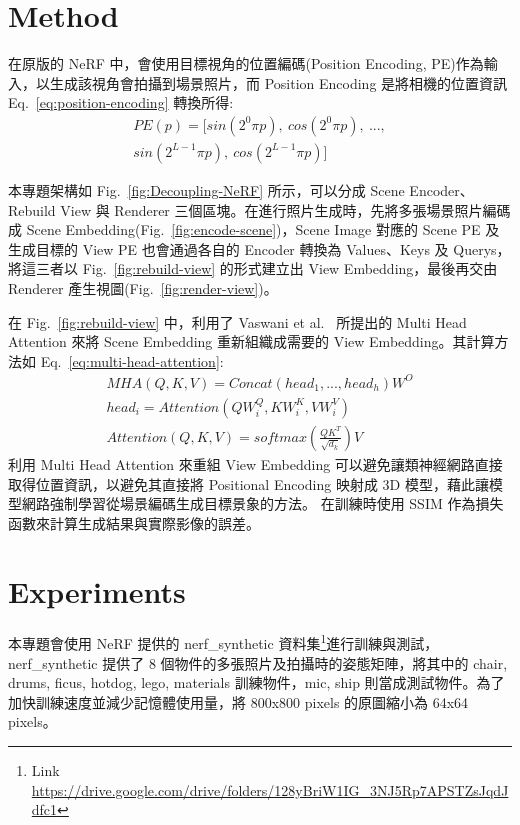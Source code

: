 \documentclass[10pt,twocolumn,letterpaper]{article}
\begin{document}
\begin{CJK}{UTF8}{bkai}
   \section{Method}

   在原版的 NeRF 中，會使用目標視角的位置編碼(Position Encoding,
   PE)作為輸入，以生成該視角會拍攝到場景照片，而 Position Encoding
   是將相機的位置資訊 Eq.~\ref{eq:position-encoding} 轉換所得:
   \begin{equation}
      \begin{aligned}
         PE(p)=[sin(2^{0}{\pi}{p}),~cos(2^{0}{\pi}{p}),~..., \\
         sin(2^{L-1}{\pi}{p}),~cos(2^{L-1}{\pi}{p})]
      \end{aligned}
      \label{eq:position-encoding}
   \end{equation}

   本專題架構如 Fig.~\ref{fig:Decoupling-NeRF} 所示，可以分成 Scene Encoder、Rebuild View 與 Renderer
   三個區塊。在進行照片生成時，先將多張場景照片編碼成 Scene Embedding(Fig.~\ref{fig:encode-scene})，Scene Image 對應的 Scene PE 及生成目標的 View
   PE 也會通過各自的 Encoder 轉換為 Values、Keys 及 Querys，將這三者以 Fig.~\ref{fig:rebuild-view} 的形式建立出
   View Embedding，最後再交由 Renderer 產生視圖(Fig.~\ref{fig:render-view})。

   在 Fig.~\ref{fig:rebuild-view} 中，利用了 Vaswani et al.~\cite{AttentionIsAllYouNeed} 所提出的
   Multi Head Attention 來將 Scene Embedding 重新組織成需要的 View Embedding。其計算方法如 Eq.~\ref{eq:multi-head-attention}:
   \begin{equation}
      \begin{aligned}
         MHA(Q, K, V) = Concat(head_{1},...,head_{h})W^{O}      \\
         head_{i} = Attention(QW^{Q}_{i},KW^{K}_{i},VW^{V}_{i}) \\
         Attention(Q, K, V ) = softmax(\frac{QK^{T}}{\sqrt{d_{k}}})V
      \end{aligned}
      \label{eq:multi-head-attention}
   \end{equation}
   利用 Multi Head Attention 來重組 View Embedding 可以避免讓類神經網路直接取得位置資訊，以避免其直接將
   Positional Encoding 映射成 3D 模型，藉此讓模型網路強制學習從場景編碼生成目標景象的方法。
   在訓練時使用 SSIM\cite{SSIM} 作為損失函數來計算生成結果與實際影像的誤差。

   \section{Experiments}
   本專題會使用 NeRF 提供的 nerf\_synthetic 資料集\footnote{Link \href{https://drive.google.com/drive/folders/128yBriW1IG_3NJ5Rp7APSTZsJqdJdfc1}{https://drive.google.com/drive/folders/128yBriW1IG\_3NJ5Rp7APSTZsJqdJdfc1}}進行訓練與測試，nerf\_synthetic 提供了
   8 個物件的多張照片及拍攝時的姿態矩陣，將其中的 chair, drums, ficus, hotdog, lego, materials 訓練物件，mic, ship 則當成測試物件。為了加快訓練速度並減少記憶體使用量，將 800x800 pixels 的原圖縮小為 64x64 pixels。


\end{CJK}
\end{document}
